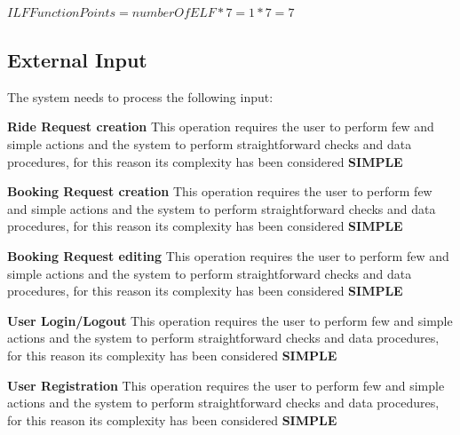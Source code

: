 \documentclass[11pt,titlepage]{article} %
\begin{document}
    \begin{center}
     $ ILF Function Points = numberOfELF * 7 = 1 * 7 = 7 $
    \end{center}
    
    \subsection{External Input}
     The system needs to process the following input: \newline

      \noindent \textbf{Ride Request creation}\newline
      This operation requires the user to perform few and simple actions and the system to perform straightforward checks and data procedures,
      for this reason its complexity has been considered \textbf{SIMPLE}\newline\newline
      
      \noindent \textbf{Booking Request creation}\newline
      This operation requires the user to perform few and simple actions and the system to perform straightforward checks and data procedures,
      for this reason its complexity has been considered \textbf{SIMPLE}\newline\newline
      
      \noindent \textbf{Booking Request editing}\newline
      This operation requires the user to perform few and simple actions and the system to perform straightforward checks and data procedures,
      for this reason its complexity has been considered \textbf{SIMPLE}\newline\newline
      
      \noindent \textbf{User Login/Logout}\newline
      This operation requires the user to perform few and simple actions and the system to perform straightforward checks and data procedures,
      for this reason its complexity has been considered \textbf{SIMPLE}\newline\newline
      
      \noindent \textbf{User Registration}\newline
      This operation requires the user to perform few and simple actions and the system to perform straightforward checks and data procedures,
      for this reason its complexity has been considered \textbf{SIMPLE}\newline\newline
      
\end{document}
